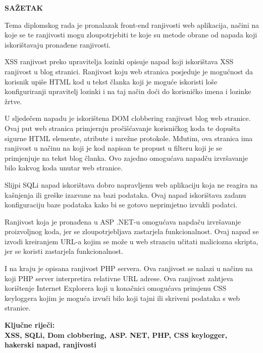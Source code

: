 
\newpage
\setlength{\parindent}{0in}
{\fontsize{14}{18}\bf {SAŽETAK}}

\vskip 15mm
   
\textnormal{
Tema diplomskog rada je pronalazak front-end ranjivosti web aplikacija, načini na koje se te ranjivosti mogu zloupotrjebiti te koje su metode obrane od napada koji iskorištavaju pronađene ranjivosti. }

\textnormal{
XSS ranjivost preko upravitelja lozinki opisuje napad koji iskorištava XSS ranjivost u blog stranici. Ranjivost koju web stranica posjeduje je mogućnost da korisnik upiše HTML kod u tekst članka koji je moguće iskoristi loše konfiguriranji upravitelj lozinki i na taj način doći do korisničko imena i lozinke žrtve.}

\textnormal{
U sljedečem napadu je iskorištena DOM clobbering ranjivost blog web stranice. Ovaj put web stranica primjernju pročišćavanje korisničkog koda te dopušta sigurne HTML elemente, atribute i mrežne protokole. Mđutim, ova stranica ima ranjivost u načinu na koji je kod napisan te propust u filteru koji je se primjenjuje na tekst blog članka. Ovo zajedno omogućava napadču izvršavanje bilo kakvog koda unutar web stranice.}

\textnormal{
Slijpi SQLi napad iskorištava dobro napravljenu web aplikaciju koja ne reagira na kašnjenja ili greške izazvane na bazi podataka. Ovaj napad iskorištava zadanu konfiguraciju baze podataka kako bi se gotovo neprimjetno izvukli podatci.}

\textnormal{
Ranjivost koja je pronađena u ASP .NET-u omogućava napdaču izvršavanje proizvoljnog koda, jer se zloupotrjebljava zastarjela funkcionalnost. Ovaj napad se izvodi kreiranjem URL-a kojim se može u web stranciu učitati maliciozna skripta, jer se koristi zastarjela funkcionalnost.}

\textnormal{
I na kraju je opisana ranjivost PHP servera. Ova ranjivost se nalazi u načinu na koji PHP server interpretira relativne URL adrese. Ova ranjivost zahtjeva korištenje Internet Explorera koji u konačnici omogućava primjenu CSS keyloggera kojim je moguća izvuči bilo koji tajni ili skriveni podataka s web stranice.}


\vskip 15mm
\bf{Ključne riječi:\\}
\textnormal{XSS, SQLi, Dom clobbering, ASP. NET, PHP, CSS keylogger, hakerski napad, ranjivosti}


